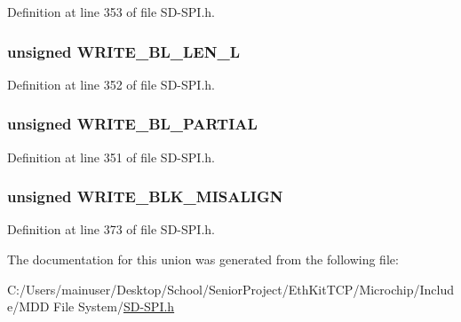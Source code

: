 Definition at line 353 of file S\+D-\/\+S\+P\+I.\+h.

\hypertarget{union_c_s_d_af3021e3510ae4d7c6bb67db7631e618c}{}
\subsubsection[{W\+R\+I\+T\+E\+\_\+\+B\+L\+\_\+\+L\+E\+N\+\_\+\+L}]{\setlength{\rightskip}{0pt plus 5cm}unsigned W\+R\+I\+T\+E\+\_\+\+B\+L\+\_\+\+L\+E\+N\+\_\+\+L}\label{union_c_s_d_af3021e3510ae4d7c6bb67db7631e618c}


Definition at line 352 of file S\+D-\/\+S\+P\+I.\+h.

\hypertarget{union_c_s_d_a43b1868270aabc9a86957afb7e6284e6}{}
\subsubsection[{W\+R\+I\+T\+E\+\_\+\+B\+L\+\_\+\+P\+A\+R\+T\+I\+A\+L}]{\setlength{\rightskip}{0pt plus 5cm}unsigned W\+R\+I\+T\+E\+\_\+\+B\+L\+\_\+\+P\+A\+R\+T\+I\+A\+L}\label{union_c_s_d_a43b1868270aabc9a86957afb7e6284e6}


Definition at line 351 of file S\+D-\/\+S\+P\+I.\+h.

\hypertarget{union_c_s_d_a388e50ae80756e0a2bc1d64555da71ab}{}
\subsubsection[{W\+R\+I\+T\+E\+\_\+\+B\+L\+K\+\_\+\+M\+I\+S\+A\+L\+I\+G\+N}]{\setlength{\rightskip}{0pt plus 5cm}unsigned W\+R\+I\+T\+E\+\_\+\+B\+L\+K\+\_\+\+M\+I\+S\+A\+L\+I\+G\+N}\label{union_c_s_d_a388e50ae80756e0a2bc1d64555da71ab}


Definition at line 373 of file S\+D-\/\+S\+P\+I.\+h.



The documentation for this union was generated from the following file\+:\begin{DoxyCompactItemize}
\item 
C\+:/\+Users/mainuser/\+Desktop/\+School/\+Senior\+Project/\+Eth\+Kit\+T\+C\+P/\+Microchip/\+Include/\+M\+D\+D File System/\hyperlink{_s_d-_s_p_i_8h}{S\+D-\/\+S\+P\+I.\+h}\end{DoxyCompactItemize}
